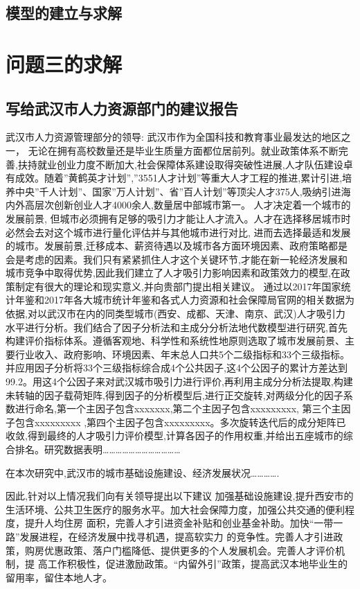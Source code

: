 \documentclass{whutmod}
\begin{document}
	\subsection{模型的建立与求解}
	

	\section{问题三的求解}
	
	
	\subsection{写给武汉市人力资源部门的建议报告}
	
武汉市人力资源管理部分的领导:
武汉市作为全国科技和教育事业最发达的地区之一， 无论在拥有高校数量还是毕业生质量方面都位居前列。就业政策体系不断完善,扶持就业创业力度不断加大,社会保障体系建设取得突破性进展,人才队伍建设卓有成效。随着”黄鹤英才计划”,”3551人才计划”等重大人才工程的推进,累计引进,培养中央”千人计划”、国家”万人计划”、省”百人计划”等顶尖人才375人,吸纳引进海内外高层次创新创业人才4000余人,数量居中部城市第一。
人才决定着一个城市的发展前景, 但城市必须拥有足够的吸引力才能让人才流入。人才在选择移居城市时必然会去对这个城市进行量化评估并与其他城市进行对比, 进而去选择最适和发展的城市。发展前景,迁移成本、薪资待遇以及城市各方面环境因素、政府策略都是会是考虑的因素。我们只有紧紧抓住人才这个关键环节,才能在新一轮经济发展和城市竞争中取得优势,因此我们建立了人才吸引力影响因素和政策效力的模型,在政策制定有很大的理论和现实意义,并向贵部门提出相关建议。
通过以2017年国家统计年鉴和2017年各大城市统计年鉴和各式人力资源和社会保障局官网的相关数据为依据,对以武汉市在内的同类型城市(西安、成都、天津、南京、武汉)人才吸引力水平进行分析。我们结合了因子分析法和主成分分析法地代数模型进行研究,首先构建评价指标体系。遵循客观地、科学性和系统性地原则选取了城市发展前景、主要行业收入、政府影响、环境因素、年末总人口共5个二级指标和33个三级指标。并应用因子分析将33个三级指标综合成4个公共因子,这4个公因子的累计方差达到99.2。用这4个公因子来对武汉城市吸引力进行评价,再利用主成分分析法提取,构建未转轴的因子载荷矩阵,得到因子的分析模型后,进行正交旋转,对两级分化的因子系数进行命名,第一个主因子包含xxxxxxx,第二个主因子包含xxxxxxxxx, 第三个主因子包含xxxxxxxxx ,第四个主因子包含xxxxxxxxx。多次旋转迭代后的成分矩阵已收敛,得到最终的人才吸引力评价模型,计算各因子的作用权重,并给出五座城市的综合排名。研究数据表明………………………………


在本次研究中,武汉市的城市基础设施建设、经济发展状况………….


因此,针对以上情况我们向有关领导提出以下建议
加强基础设施建设,提升西安市的生活环境、公共卫生医疗的服务水平。加大社会保障力度，加强公共交通的便利程度，提升人均住房 面积，完善人才引进资金补贴和创业基金补助。加快“一带一路”发展进程，在经济发展中找寻机遇，提高软实力 的竞争性。完善人才引进政策，购房优惠政策、落户门槛降低、提供更多的个人发展机会。完善人才评价机制，提 高工作积极性，促进激励政策。“内留外引”政策，提高武汉本地毕业生的留用率，留住本地人才。
\end{document}
